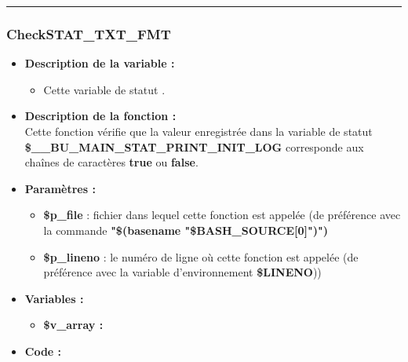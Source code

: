 \documentclass[a4paper,10pt]{article}
\begin{document}
\color{blue}\par\noindent\rule{\textwidth}{0.4pt}\color{white}

\color{blue}
\subsubsection{CheckSTAT\_TXT\_FMT}\color{white}
\begin{itemize}
    \item \textbf{Description de la variable :}
    \begin{itemize}
        \item Cette variable de statut .\\[1\baselineskip]
    \end{itemize}


    \item \textbf{Description de la fonction :}\\
        Cette fonction vérifie que la valeur enregistrée dans la variable de statut\\ \textbf{\color{orange}\$\_\_BU\_MAIN\_STAT\_PRINT\_INIT\_LOG} corresponde aux chaînes de caractères \textbf{true} ou \textbf{false}.\\[1\baselineskip]

    \item \textbf{Paramètres :}
    \begin{itemize}
        \item \color{orange}\textbf{\$p\_file}\color{white} : fichier dans lequel cette fonction est appelée (de préférence avec la commande \textbf{"\$(\color{gray}basename \color{white}"\color{orange}\$BASH\_SOURCE[0]\color{white}")")}\\[1\baselineskip]

        \item \color{orange}\textbf{\$p\_lineno}\color{white} : le numéro de ligne où cette fonction est appelée (de préférence avec la variable d'environnement \textbf{\color{orange}\$LINENO}))\\[1\baselineskip]
    \end{itemize}

    \item \textbf{Variables :}
    \begin{itemize}
        \item \textbf{\color{orange}\$v\_array\color{white} :}\\[1\baselineskip]
    \end{itemize}


    \item \textbf{Code :}
\end{itemize}
\end{document}
